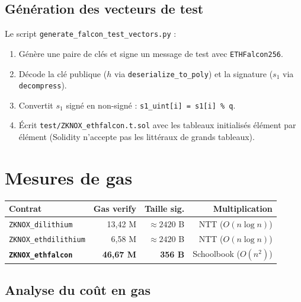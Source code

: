 \documentclass[11pt,a4paper]{article}
\begin{document}
\subsection{Génération des vecteurs de test}

Le script \texttt{generate\_falcon\_test\_vectors.py} :
\begin{enumerate}
  \item Génère une paire de clés et signe un message de test avec
        \texttt{ETHFalcon256}.
  \item Décode la clé publique ($h$ via \texttt{deserialize\_to\_poly}) et
        la signature ($s_1$ via \texttt{decompress}).
  \item Convertit $s_1$ signé en non-signé : \texttt{s1\_uint[i] = s1[i] \% q}.
  \item Écrit \texttt{test/ZKNOX\_ethfalcon.t.sol} avec les tableaux
        initialisés élément par élément (Solidity n'accepte pas les littéraux
        de grands tableaux).
\end{enumerate}

\section{Mesures de gas}

\begin{resultbox}[title={Résultats forge test --gas-report}]
\begin{center}
\begin{tabular}{lrrr}
\toprule
\textbf{Contrat} & \textbf{Gas verify} & \textbf{Taille sig.} & \textbf{Multiplication} \\
\midrule
\texttt{ZKNOX\_dilithium}    & 13{,}42 M & $\approx 2420$ B & NTT ($O(n\log n)$) \\
\texttt{ZKNOX\_ethdilithium} & 6{,}58 M  & $\approx 2420$ B & NTT ($O(n\log n)$) \\
\textbf{\texttt{ZKNOX\_ethfalcon}} & \textbf{46{,}67 M} & \textbf{356 B} & Schoolbook ($O(n^2)$) \\
\bottomrule
\end{tabular}
\end{center}
\end{resultbox}

\subsection{Analyse du coût en gas}
\end{document}
